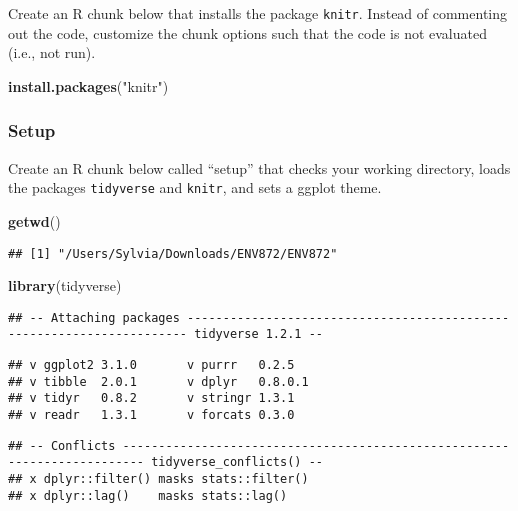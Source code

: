 \documentclass[]{article}
\newenvironment{Shaded}{\begin{snugshade}}{\end{snugshade}}
\newcommand{\KeywordTok}[1]{\textcolor[rgb]{0.13,0.29,0.53}{\textbf{#1}}}
\newcommand{\StringTok}[1]{\textcolor[rgb]{0.31,0.60,0.02}{#1}}
\newcommand{\NormalTok}[1]{#1}
\begin{document}
Create an R chunk below that installs the package \texttt{knitr}.
Instead of commenting out the code, customize the chunk options such
that the code is not evaluated (i.e., not run).

\begin{Shaded}
\begin{Highlighting}[]
\KeywordTok{install.packages}\NormalTok{(}\StringTok{"knitr"}\NormalTok{)}
\end{Highlighting}
\end{Shaded}

\subsubsection{Setup}\label{setup}

Create an R chunk below called ``setup'' that checks your working
directory, loads the packages \texttt{tidyverse} and \texttt{knitr}, and
sets a ggplot theme.

\begin{Shaded}
\begin{Highlighting}[]
\KeywordTok{getwd}\NormalTok{()}
\end{Highlighting}
\end{Shaded}

\begin{verbatim}
## [1] "/Users/Sylvia/Downloads/ENV872/ENV872"
\end{verbatim}

\begin{Shaded}
\begin{Highlighting}[]
\KeywordTok{library}\NormalTok{(tidyverse)}
\end{Highlighting}
\end{Shaded}

\begin{verbatim}
## -- Attaching packages ---------------------------------------------------------------------- tidyverse 1.2.1 --
\end{verbatim}

\begin{verbatim}
## v ggplot2 3.1.0       v purrr   0.2.5  
## v tibble  2.0.1       v dplyr   0.8.0.1
## v tidyr   0.8.2       v stringr 1.3.1  
## v readr   1.3.1       v forcats 0.3.0
\end{verbatim}

\begin{verbatim}
## -- Conflicts ------------------------------------------------------------------------- tidyverse_conflicts() --
## x dplyr::filter() masks stats::filter()
## x dplyr::lag()    masks stats::lag()
\end{verbatim}
\end{document}
